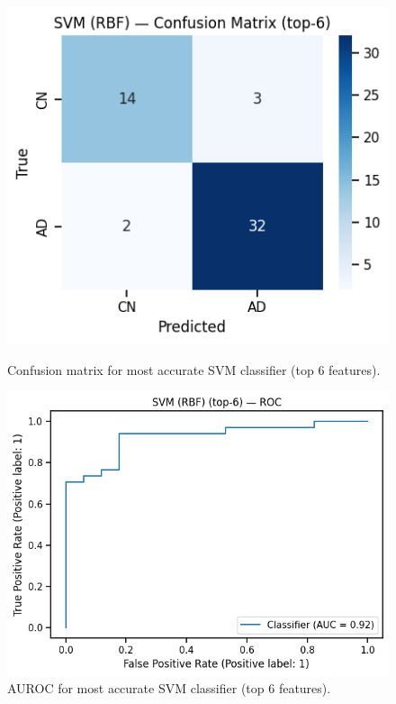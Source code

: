 \documentclass[a4paper,12pt]{article}
\begin{document}
\begin{figure}[H]
\centering
\begin{minipage}{0.48\textwidth}
    \centering
    \includegraphics[width=\textwidth]{Pics/svm_confusion_matrix_6.png}
    \caption{Confusion matrix for most accurate SVM classifier (top 6 features).}
    \label{fig:svm-cm}
\end{minipage}
\hfill
\begin{minipage}{0.48\textwidth}
    \centering
    \includegraphics[width=\textwidth]{Pics/svm_roc_6.png}
    \caption{AUROC for most accurate SVM classifier (top 6 features).}
    \label{fig:svm-roc}
\end{minipage}
\end{figure}
\end{document}
